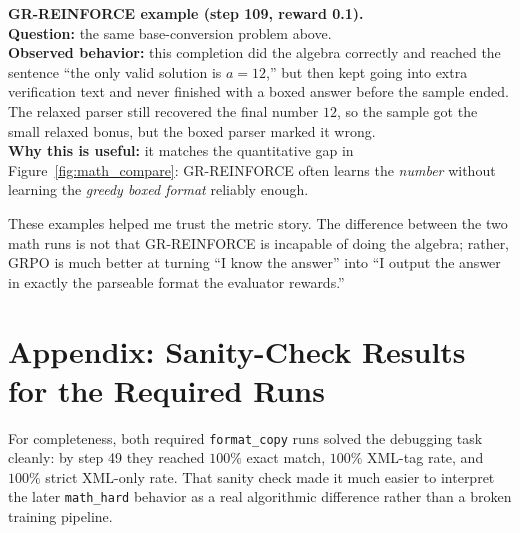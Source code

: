 \documentclass[11pt]{article}
\begin{document}
\begin{examplebox}
\textbf{GR-REINFORCE example (step 109, reward 0.1).} \\
\textbf{Question:} the same base-conversion problem above. \\
\textbf{Observed behavior:} this completion did the algebra correctly and reached the sentence ``the only valid solution is \(a=12\),'' but then kept going into extra verification text and never finished with a boxed answer before the sample ended. The relaxed parser still recovered the final number \(12\), so the sample got the small relaxed bonus, but the boxed parser marked it wrong. \\
\textbf{Why this is useful:} it matches the quantitative gap in Figure~\ref{fig:math_compare}: GR-REINFORCE often learns the \emph{number} without learning the \emph{greedy boxed format} reliably enough.
\end{examplebox}

These examples helped me trust the metric story. The difference between the two math runs is not that GR-REINFORCE is incapable of doing the algebra; rather, GRPO is much better at turning ``I know the answer'' into ``I output the answer in exactly the parseable format the evaluator rewards.''

\section*{Appendix: Sanity-Check Results for the Required Runs}
For completeness, both required \texttt{format\_copy} runs solved the debugging task cleanly: by step 49 they reached \(100\%\) exact match, \(100\%\) XML-tag rate, and \(100\%\) strict XML-only rate. That sanity check made it much easier to interpret the later \texttt{math\_hard} behavior as a real algorithmic difference rather than a broken training pipeline.
\end{document}
